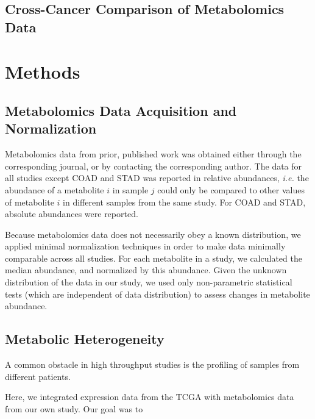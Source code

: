 \documentclass[10pt]{article}
\begin{document}
\subsection{Cross-Cancer Comparison of Metabolomics Data}


\section{Methods}

\subsection{Metabolomics Data Acquisition and Normalization}
Metabolomics data from prior, published work was obtained either through the corresponding journal, or by contacting the corresponding author. The data for all studies except COAD and STAD was reported in relative abundances, \textit{i.e.} the abundance of a metabolite $i$ in sample $j$ could only be compared to other values of metabolite $i$ in different samples from the same study. For COAD and STAD, absolute abundances were reported.

Because metabolomics data does not necessarily obey a known distribution, we applied minimal normalization techniques in order to make data minimally comparable across all studies. For each metabolite in a study, we calculated the median abundance, and normalized by this abundance. Given the unknown distribution of the data in our study, we used only non-parametric statistical tests (which are independent of data distribution) to assess changes in metabolite abundance.

\subsection{Metabolic Heterogeneity}

A common obstacle in high throughput studies is the profiling of samples from different patients.

Here, we integrated expression data from the TCGA with metabolomics data from our own study. Our goal was to 
 
\end{document}
